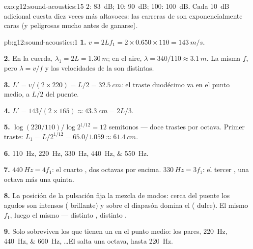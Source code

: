 \begin{solution}{exo:g12:sound-acoustics:15}
$2$: \qty{83}{dB}; $10$: \qty{90}{dB}; $100$: \qty{100}{dB}. Cada
\qty{+10}{dB} adicional cuesta diez veces más altavoces: las carreras de
 son exponencialmente caras (y peligrosas mucho antes de
ganarse).
\end{solution}

\begin{solution}{pb:g12:sound-acoustics:1}
\textbf{1.} $v = 2Lf_1 = 2 \times 0.650 \times 110 = \qty{143}{m/s}$.

\textbf{2.} En la cuerda, $\lambda_1 = 2L = \qty{1.30}{m}$; en el aire,
$\lambda = 340/110 \approx \qty{3.1}{m}$. La misma $f$, pero
$\lambda = v/f$ y las velocidades de la  son distintas.

\textbf{3.} $L' = v/(2 \times 220) = L/2 = \qty{32.5}{cm}$: el traste
duodécimo va en el punto medio, a $L/2$ del puente.

\textbf{4.} $L' = 143/(2 \times 165) \approx \qty{43.3}{cm} = 2L/3$.

\textbf{5.} $\log(220/110)/\log 2^{1/12} = 12$ semitonos --- doce
trastes por octava. Primer traste:
$L_1 = L/2^{1/12} = 65.0/1.059 \approx \qty{61.4}{cm}$.

\textbf{6.} \qtylist{110;220;330;440;550}{Hz}.

\textbf{7.} $\qty{440}{Hz} = 4f_1$: el cuarto , dos octavas por
encima. $\qty{330}{Hz} = 3f_1$: el tercer , una octava más una
quinta.

\textbf{8.} La posición de la pulsación fija la mezcla de modos: cerca
del puente los  agudos son intensos ( brillante) y
sobre el diapasón domina el  ( dulce). El mismo $f_1$,
luego el mismo  --- distinto , distinto .

\textbf{9.} Solo sobreviven los  que tienen un  en el punto
medio: los pares, \qtylist{220;440;660}{Hz}, \dots El  salta una
octava, hasta \qty{220}{Hz}.


\end{solution}
